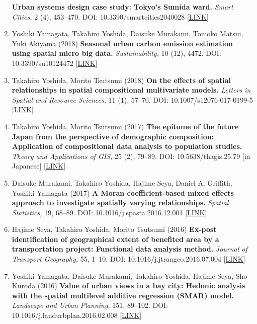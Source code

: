 \documentclass[]{book}
\begin{document}
\begin{enumerate}
  \textbf{Urban systems design case study: Tokyo's Sumida ward.}
  \emph{Smart Cities,} 2 (4), 453--470.
  DOI: 10.3390/smartcities2040028 {[}\href{https://www.mdpi.com/2624-6511/2/4/28}{LINK}{]}
\item
  Yoshiki Yamagata, Takahiro Yoshida, Daisuke Murakami, Tomoko Matsui, Yuki Akiyama (2018)
  \textbf{Seasonal urban carbon emission estimation using spatial micro big data.}
  \emph{Sustainability,} 10 (12), 4472.
  DOI: 10.3390/su10124472 {[}\href{https://www.mdpi.com/2071-1050/10/12/4472}{LINK}{]}
\item
  Takahiro Yoshida, Morito Tsutsumi (2018)
  \textbf{On the effects of spatial relationships in spatial compositional multivariate models.}
  \emph{Letters in Spatial and Resource Sciences,} 11 (1), 57--70.
  DOI: 10.1007/s12076-017-0199-5 {[}\href{https://link.springer.com/article/10.1007/s12076-017-0199-5}{LINK}{]}
\item
  Takahiro Yoshida, Morito Tsutsumi (2017)
  \textbf{The epitome of the future Japan from the perspective of demographic composition: Application of compositional data analysis to population studies.}
  \emph{Theory and Applications of GIS,} 25 (2), 79--89.
  DOI: 10.5638/thagis.25.79 {[}in Japanese{]} {[}\href{https://www.jstage.jst.go.jp/article/thagis/25/2/25_79/_article/-char/en}{LINK}{]}
\item
  Daisuke Murakami, Takahiro Yoshida, Hajime Seya, Daniel A. Griffith, Yoshiki Yamagata (2017)
  \textbf{A Moran coefficient-based mixed effects approach to investigate spatially varying relationships.}
  \emph{Spatial Statistics,} 19, 68--89.
  DOI: 10.1016/j.spasta.2016.12.001 {[}\href{http://www.sciencedirect.com/science/article/pii/S2211675316301798}{LINK}{]}
\item
  Hajime Seya, Takahiro Yoshida, Morito Tsutsumi (2016)
  \textbf{Ex-post identification of geographical extent of benefited area by a transportation project: Functional data analysis method.}
  \emph{Journal of Transport Geography,} 55, 1--10.
  DOI: 10.1016/j.jtrangeo.2016.07.004 {[}\href{http://www.sciencedirect.com/science/article/pii/S0966692316303763}{LINK}{]}
\item
  Yoshiki Yamagata, Daisuke Murakami, Takahiro Yoshida, Hajime Seya, Sho Kuroda (2016)
  \textbf{Value of urban views in a bay city: Hedonic analysis with the spatial multilevel additive regression (SMAR) model.}
  \emph{Landscape and Urban Planning,} 151, 89--102.
  DOI: 10.1016/j.landurbplan.2016.02.008 {[}\href{http://www.sciencedirect.com/science/article/pii/S0169204616000232}{LINK}{]}
\end{enumerate}
\end{document}
